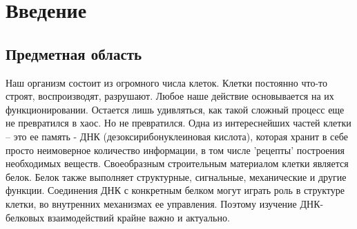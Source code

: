 \documentclass{matmex-diploma-custom}
\begin{document}
\maketitle
\tableofcontents
\section*{Введение}
\subsection*{Предметная область}
Наш организм состоит из огромного числа клеток. Клетки постоянно что-то строят, воспроизводят, разрушают. Любое наше действие основывается на их функционировании.
Остается лишь удивляться, как такой сложный процесс еще не превратился в хаос.
Но не превратился. Одна из интереснейших частей клетки -- это ее память - ДНК (дезоксирибонуклеиновая кислота), которая хранит в себе просто неимоверное количество информации, в том числе 'рецепты' построения необходимых веществ. Своеобразным строительным материалом клетки является белок. Белок также выполняет структурные, сигнальные, механические и другие функции. Соединения ДНК с конкретным белком могут играть роль в структуре клетки, во внутренних механизмах ее управления. Поэтому изучение ДНК-белковых взаимодействий крайне важно и актуально.
\end{document}
